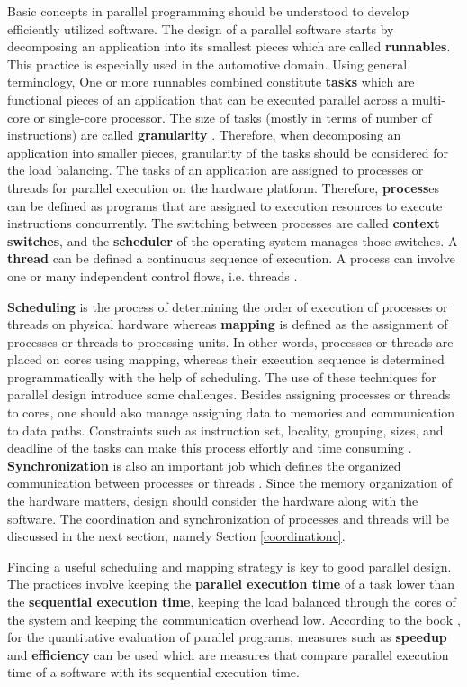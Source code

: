 Basic concepts in parallel programming should be understood to develop efficiently utilized software. The design of a parallel software starts by decomposing an application into its smallest pieces which are called \textbf{runnables}. This practice is especially used in the automotive domain. Using general terminology, One or more runnables combined constitute \textbf{tasks} which are functional pieces of an application that can be executed parallel across a multi-core or single-core processor. The size of tasks (mostly in terms of number of instructions) are called \textbf{granularity} \cite{springerparallel}. Therefore, when decomposing an application into smaller pieces, granularity of the tasks should be considered for the load balancing. The tasks of an application are assigned to processes or threads for parallel execution on the hardware platform. Therefore, \textbf{process}es can be defined as programs that are assigned to execution resources to execute instructions concurrently. The switching between processes are called \textbf{context switches}, and the \textbf{scheduler} of the operating system manages those switches. A \textbf{thread} can be defined a continuous sequence of execution. A process can involve one or many independent control flows, i.e. threads \cite{springerparallel}. 

\textbf{Scheduling} is the process of determining the order of execution of processes or threads on physical hardware whereas \textbf{mapping} is defined as the assignment of processes or threads to processing units. In other words, processes or threads are placed on cores using mapping, whereas their execution sequence is determined programmatically with the help of scheduling. The use of these techniques for parallel design introduce some challenges. Besides assigning processes or threads to cores, one should also manage assigning data to memories and communication to data paths. Constraints such as instruction set, locality, grouping,  sizes, and deadline of the tasks can make this process effortly and time consuming \cite{lukas1}. \textbf{Synchronization} is also an important job which defines the organized communication between processes or threads \cite{springerparallel}. Since the memory organization of the hardware matters, design should consider the hardware along with the software. The coordination and synchronization of processes and threads will be discussed in the next section, namely Section \ref{coordinationc}.

Finding a useful scheduling and mapping strategy is key to good parallel design. The practices involve keeping the \textbf{parallel execution time} of a task lower than the \textbf{sequential execution time}, keeping the load balanced through the cores of the system and keeping the communication overhead low. According to the book \cite{springerparallel}, for the quantitative evaluation of parallel programs, measures such as \textbf{speedup} and \textbf{efficiency} can be used which are measures that compare parallel execution time of a software with its sequential execution time.

